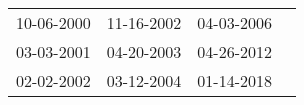 \begin{supertabular}{llll}
 10-06-2000 &  11-16-2002 &  04-03-2006 \\
 03-03-2001 &  04-20-2003 &  04-26-2012 \\
 02-02-2002 &  03-12-2004 &  01-14-2018 \\
\end{supertabular}
